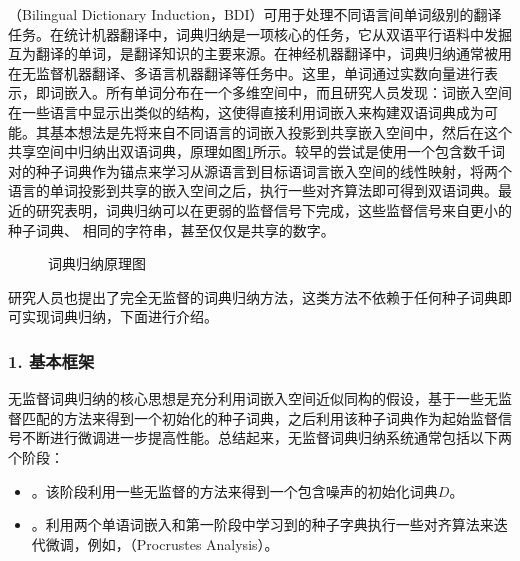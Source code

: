 （Bilingual Dictionary Induction，BDI）可用于处理不同语言间单词级别的翻译任务。在统计机器翻译中，词典归纳是一项核心的任务，它从双语平行语料中发掘互为翻译的单词，是翻译知识的主要来源。在神经机器翻译中，词典归纳通常被用在无监督机器翻译、多语言机器翻译等任务中。这里，单词通过实数向量进行表示，即词嵌入。所有单词分布在一个多维空间中，而且研究人员发现：词嵌入空间在一些语言中显示出类似的结构，这使得直接利用词嵌入来构建双语词典成为可能。其基本想法是先将来自不同语言的词嵌入投影到共享嵌入空间中，然后在这个共享空间中归纳出双语词典，原理如图\ref{fig:16-16}所示。较早的尝试是使用一个包含数千词对的种子词典作为锚点来学习从源语言到目标语词言嵌入空间的线性映射，将两个语言的单词投影到共享的嵌入空间之后，执行一些对齐算法即可得到双语词典。最近的研究表明，词典归纳可以在更弱的监督信号下完成，这些监督信号来自更小的种子词典、 相同的字符串，甚至仅仅是共享的数字。
\begin{figure}[h]
\centering

\caption{词典归纳原理图}
\label{fig:16-16}
\end{figure}

\parinterval 研究人员也提出了完全无监督的词典归纳方法，这类方法不依赖于任何种子词典即可实现词典归纳，下面进行介绍。

\subsubsection{1. 基本框架}

\parinterval 无监督词典归纳的核心思想是充分利用词嵌入空间近似同构的假设，基于一些无监督匹配的方法来得到一个初始化的种子词典，之后利用该种子词典作为起始监督信号不断进行微调进一步提高性能。总结起来，无监督词典归纳系统通常包括以下两个阶段：

\begin{itemize}
\vspace{0.5em}
\item {\small{}}。该阶段利用一些无监督的方法来得到一个包含噪声的初始化词典$D$。
\vspace{0.5em}
\item {\small{}}。利用两个单语词嵌入和第一阶段中学习到的种子字典执行一些对齐算法来迭代微调，例如，{\small{}}（Procrustes Analysis）。
\vspace{0.5em}
\end{itemize}

